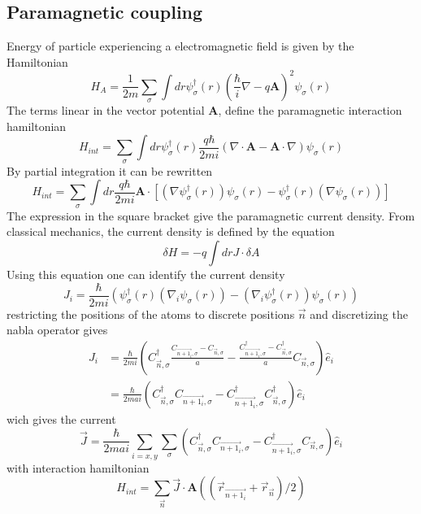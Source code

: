 \documentclass{article}
\begin{document}
\subsection{Paramagnetic coupling}
Energy of particle experiencing a electromagnetic field is given by the Hamiltonian
\begin{equation}
    H_A = \frac{1}{2m} \sum_{\sigma} \int dr \psi_{\sigma}^{\dagger}(r) \left( \frac{\hbar}{i} \nabla - q \textbf{A} \right)^2 \psi_{\sigma}(r) 
\end{equation}
The terms linear in the vector potential $\textbf{A}$, define the paramagnetic interaction hamiltonian
\begin{equation}
    H_{int} = \sum_{\sigma} \int dr  \psi_{\sigma}^{\dagger}(r) \frac{q\hbar}{2mi}\left(  \nabla \cdot \textbf{A}  -  \textbf{A} \cdot \nabla \right) \psi_{\sigma}(r) 
\end{equation}
By partial integration it can be rewritten
\begin{equation}
    H_{int} = \sum_{\sigma} \int dr \frac{q\hbar}{2mi} \textbf{A} \cdot \left[  (\nabla  \psi_{\sigma}^{\dagger}(r)) \psi_{\sigma}(r)   -   \psi_{\sigma}^{\dagger}(r) (\nabla \psi_{\sigma}(r))  \right]
\end{equation}
The expression in the square bracket give the paramagnetic current density. From classical mechanics, the current density is defined by the equation
\begin{equation}
    \delta H = - q \int dr J \cdot \delta A
\end{equation}
Using this equation one can identify the current density
\begin{equation}
    J_i = \frac{\hbar}{2mi} (\psi_{\sigma}^{\dagger}(r) (\nabla_i \psi_{\sigma}(r)) - (\nabla_i  \psi_{\sigma}^{\dagger}(r)) \psi_{\sigma}(r))
\end{equation}
restricting the positions of the atoms to discrete positions $\vec{n}$ and discretizing the nabla operator gives
\begin{align}
    J_i &= \frac{\hbar}{2mi} (C_{\vec{n},\sigma}^{\dagger} \frac{C_{\vec{n + 1_i},\sigma} - C_{\vec{n},\sigma}}{a}  - \frac{C_{\vec{n + 1_i},\sigma}^{\dagger} - C_{\vec{n},\sigma}^{\dagger}}{a} C_{\vec{n},\sigma}) \hat{e}_i\\
      &= \frac{\hbar}{2mai} (C_{\vec{n},\sigma}^{\dagger} C_{\vec{n + 1_i},\sigma} - C_{\vec{n + 1_i},\sigma}^{\dagger} C_{\vec{n},\sigma}^{\dagger})\hat{e}_i
\end{align}
wich gives the current 
\begin{equation}
    \vec{J} = \frac{\hbar}{2mai} \sum_{i=x,y}\sum_{\sigma} (C_{\vec{n},\sigma}^{\dagger} C_{\vec{n + 1_i},\sigma} - C_{\vec{n + 1_i},\sigma}^{\dagger} C_{\vec{n},\sigma})\hat{e}_i
    \label{electric current}
\end{equation}
with interaction hamiltonian 
\begin{equation}
    H_{int} = \sum_{\vec{n}} \vec{J} \cdot \textbf{A}((\vec{r}_{\vec{n + 1_i}} + \vec{r}_{\vec{n}})/2 )
    \label{interaction hamiltonian general}
\end{equation}
\end{document}
